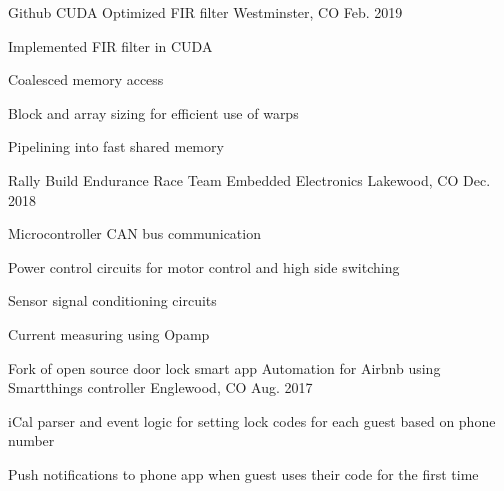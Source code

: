 

\begin{cventries}

  \cventry
    {Github}
    {CUDA Optimized FIR filter}
    {Westminster, CO} %
    {Feb. 2019} %
    {
      \begin{cvitems} %
        \item {Implemented FIR filter in CUDA}
        \item {Coalesced memory access}
        \item {Block and array sizing for efficient use of warps}
        \item {Pipelining into fast shared memory}
      \end{cvitems}
    }

  \cventry
    {Rally Build Endurance Race Team}
    {Embedded Electronics}
    {Lakewood, CO} %
    {Dec. 2018} %
    {
      \begin{cvitems} %
        \item {Microcontroller CAN bus communication}
        \item {Power control circuits for motor control and high side switching}
        \item {Sensor signal conditioning circuits}
        \item {Current measuring using Opamp}
      \end{cvitems}
    }

  \cventry
    {Fork of open source door lock smart app}
    {Automation for Airbnb using Smartthings controller}
    {Englewood, CO} %
    {Aug. 2017} %
    {
      \begin{cvitems} %
        \item {iCal parser and event logic for setting lock codes for each guest based on phone number}
        \item {Push notifications to phone app when guest uses their code for the first time}
      \end{cvitems}
    }


\end{cventries}

